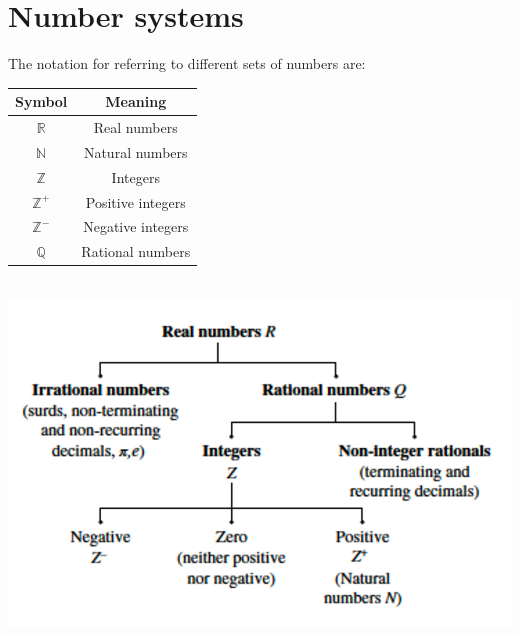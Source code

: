 \documentclass{book}
\begin{document}
\section{Number systems}
The notation for referring to different sets of numbers are:
\begin{center}
	\begin{tabular}{c|c}
		Symbol           & Meaning           \\ \hline
		$\mathbb{R}$     & Real numbers      \\
		$\mathbb{N}$     & Natural numbers   \\
		$\mathbb{Z}$     & Integers          \\
		$\mathbb{Z}^{+}$ & Positive integers \\
		$\mathbb{Z}^{-}$ & Negative integers \\
		$\mathbb{Q}$     & Rational numbers
	\end{tabular}\\
	\includegraphics[scale=0.5]{number tree}
\end{center}
\end{document}

